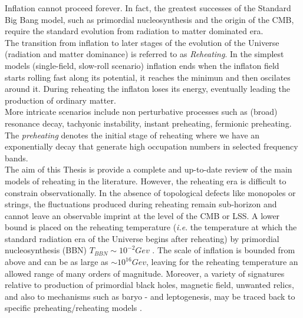\documentclass[11pt,a4paper,twoside]{book}
\begin{document}
Inflation cannot proceed forever. In fact, the greatest successes of the Standard Big Bang model, such as primordial nucleosynthesis and the origin of the CMB, require the standard evolution from radiation to matter dominated era.\\ 
The transition from inflation to later stages of the evolution of the Universe (radiation and matter dominance) is referred to as \textit{Reheating}. In the simplest models (single-field, slow-roll scenario) inflation ends when the inflaton field starts rolling fast along its potential, it reaches the minimun and then oscilates around it. During reheating the inflaton loses its energy, eventually leading the production of ordinary matter.\\
 More intricate scenarios include non perturbative processes such as (broad) resonance decay, tachyonic instability, instant preheating, fermionic preheating. The \textit{preheating} denotes the initial stage of reheating where we have an exponentially decay that generate high occupation numbers in selected frequency bands.  \\ 
 The aim of this Thesis is provide a complete and up-to-date review of the main models of reheating in the literature.
However, the reheating era is difficult to constrain observationally. In the absence of topological defects like monopoles or strings, the fluctuations produced during reheating remain sub-horizon and cannot leave an observable imprint at the level of the CMB or LSS. A lower bound is placed on the reheating temperature (\textit{i.e}. the temperature at which the standard radiation era of the Universe begins after reheating) by primordial nucleosynthesis (BBN) $ T_{BBN} \sim  10^{-2} Gev $ \cite{Steigman:nucleosynthesisIntro}. The scale of inflation is bounded from above and can be as large as $ \sim 10^{16} Gev $, leaving for the reheating temperature an allowed range of many orders of magnitude. 
Moreover, a variety of signatures relative to production of primordial black holes, magnetic field, unwanted relics, and also to mechanisms such as baryo - and leptogenesis, may be traced back to specific preheating/reheating models \cite{ReheatingPredictionsSingleFieldModel:intro} .\\ 
\end{document}
